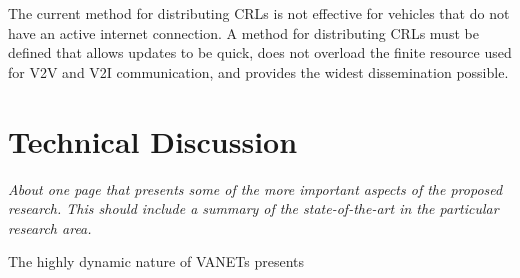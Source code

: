 \documentclass {article}
\newcommand{\sechint}[1]{\small{\emph{#1}} \bigskip}
\begin{document}
The current method for distributing CRLs is not effective for vehicles that do not have an active internet connection. A method for distributing CRLs must be defined that allows updates to be quick, does not overload the finite resource used for V2V and V2I communication, and provides the widest dissemination possible.

\section{Technical Discussion}{\sechint{About one page that presents some of the more important aspects of the proposed research. This should include a summary of the state-of-the-art in the particular research area.}}

The highly dynamic nature of VANETs presents
\end{document}
